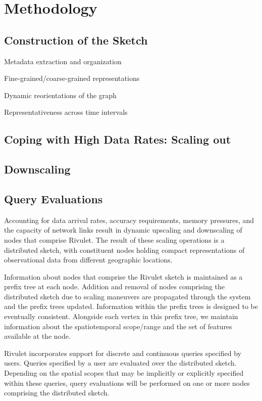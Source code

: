 \section{Methodology}
\label{sec:methodology}

\subsection{Construction of the Sketch}
Metadata extraction and organization

Fine-grained/coarse-grained representations

Dynamic reorientations of the graph

Representativeness across time intervals

\subsection{Coping with High Data Rates: Scaling out}

\subsection{Downscaling}

\subsection{Query Evaluations}
Accounting for data arrival rates, accuracy requirements, memory pressures, and the capacity of network links result in dynamic upscaling and downscaling of nodes that comprise Rivulet. The result of these scaling operations is a distributed sketch, with constituent nodes holding compact representations of observational data from different geographic locations. 

Information about nodes that comprise the Rivulet sketch is maintained as a prefix tree at each node. Addition and removal of nodes comprising the distributed sketch due to scaling maneuvers are propagated through the system and the prefix trees updated. Information within the prefix trees is designed to be eventually consistent.  Alongside each vertex in this prefix tree, we maintain information about the spatiotemporal scope/range and the set of features available at the node.  

Rivulet incorporates support for discrete and continuous queries specified by users. Queries specified by a user are evaluated over the distributed sketch. Depending on the spatial scopes that may be implicitly or explicitly specified within these queries, query evaluations will be performed on one or more nodes comprising the distributed sketch. 

